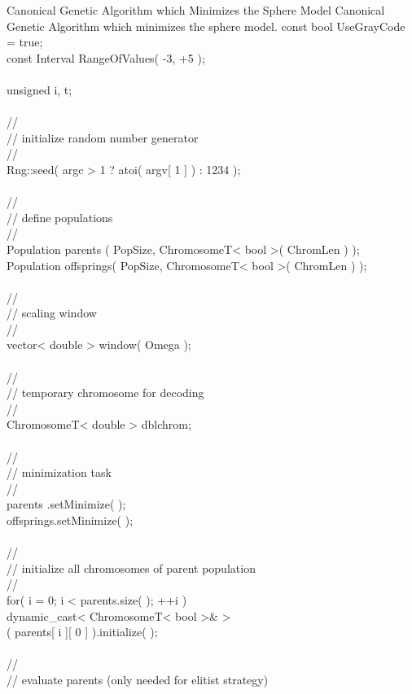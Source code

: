 \begin{programlisting}{Canonical Genetic Algorithm which Minimizes the Sphere Model}{
    Canonical Genetic Algorithm which minimizes the sphere model.}
    const bool     UseGrayCode = true;\\
    const Interval RangeOfValues( -3, +5 );\\
\\
    unsigned i, t;\\
\\
    //\\
    // initialize random number generator\\
    //\\
    Rng::seed( argc > 1 ? atoi( argv[ 1 ] ) : 1234 );\\
\\
    //\\
    // define populations\\
    //\\
    Population parents   ( PopSize, ChromosomeT< bool >( ChromLen ) );\\
    Population offsprings( PopSize, ChromosomeT< bool >( ChromLen ) );\\
\\
    //\\
    // scaling window\\
    //\\
    vector< double > window( Omega );\\
\\
    //\\
    // temporary chromosome for decoding\\
    //\\
    ChromosomeT< double > dblchrom;\\
\\
    //\\
    // minimization task\\
    //\\
    parents   .setMinimize( );\\
    offsprings.setMinimize( );\\
\\
    //\\
    // initialize all chromosomes of parent population\\
    //\\
    for( i = 0; i < parents.size( ); ++i )\\
        dynamic_cast< ChromosomeT< bool >& >\\
            ( parents[ i ][ 0 ] ).initialize( );\\
\\
    //\\
    // evaluate parents (only needed for elitist strategy)\\

\end{programlisting}
